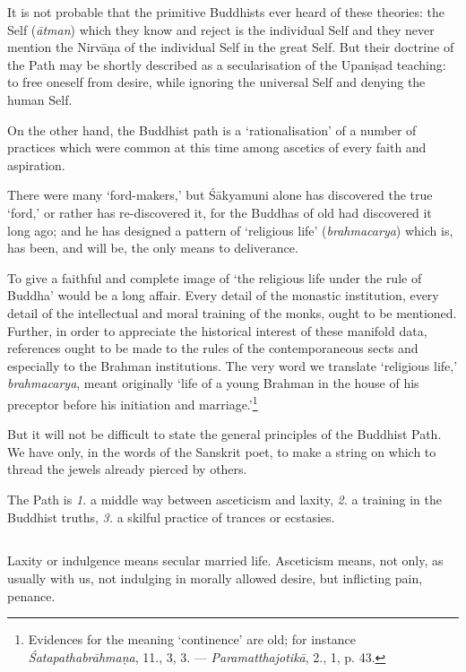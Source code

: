 \documentclass[a4paper, 11pt, oneside, english]{article}
\begin{document}
It is not probable that the primitive Buddhists ever heard of these theories: the Self (\emph{ātman}) which they know and reject is the individual Self and they never mention the Nirvāṇa of the individual Self in the great Self. But their doctrine of the Path may be shortly described as a secularisation of the Upaniṣad teaching: to free oneself from desire, while ignoring the universal Self and denying the human Self.

On the other hand, the Buddhist path is a `rationalisation' of a number of practices which were common at this time among ascetics of every faith and aspiration.

There were many `ford-makers,' but Śākyamuni alone has discovered the true `ford,' or rather has re-discovered it, for the Buddhas of old had discovered it long ago; and he has designed a pattern of `religious life' (\emph{brahmacarya}) which is, has been, and will be, the only means to deliverance.

To give a faithful and complete image of `the religious life under the rule of Buddha' would be a long affair. Every detail of the monastic institution, every detail of the intellectual and moral training of the monks, ought to be mentioned. Further, in order to appreciate the historical interest of these manifold data, references ought to be made to the rules of the contemporaneous sects and especially to the Brahman institutions. The very word we translate `religious life,' \emph{brahmacarya}, meant originally `life of a young Brahman in the house of his preceptor before his initiation and marriage.'\footnote{Evidences for the meaning `continence' are old; for instance \emph{Śatapathabrāhmaṇa}, 11., 3, 3. --- \emph{Paramatthajotikā}, 2., 1, p. 43.}

But it will not be difficult to state the general principles of the Buddhist Path. We have only, in the words of the Sanskrit poet, to make a string on which to thread the jewels already pierced by others.

The Path is \emph{1.} a middle way between asceticism and laxity, \emph{2.} a training in the Buddhist truths, \emph{3.} a skilful practice of trances or ecstasies.

\subsection{}
\paragraph{}
Laxity or indulgence means secular married life. Asceticism means, not only, as usually with us, not indulging in morally allowed desire, but inflicting pain, penance.
\end{document}
